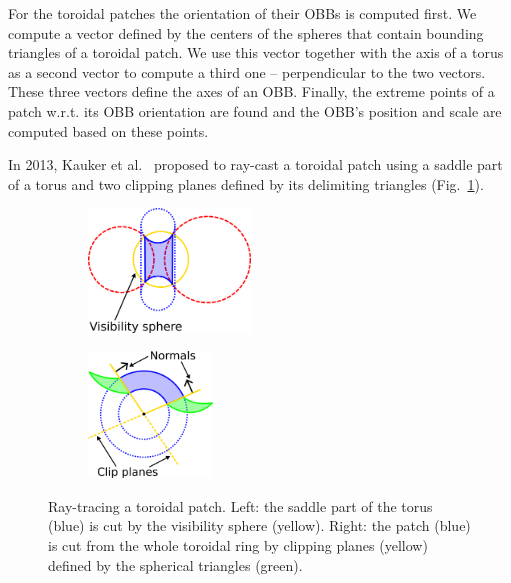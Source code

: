For the toroidal patches the orientation of their OBBs is computed first.
We compute a vector defined by the centers of the spheres that contain bounding triangles of a toroidal patch.
We use this vector together with the axis of a torus as a second vector to compute a third one -- perpendicular to the two vectors.
These three vectors define the axes of an OBB.
Finally, the extreme points of a patch w.r.t. its OBB orientation are found and the OBB's position and scale are computed based on these points.

In 2013, Kauker et al.~\cite{kauker2013rendering} proposed to ray-cast a toroidal patch using a saddle part of a torus and two clipping planes defined by its delimiting triangles (Fig.~\ref{fig:torus}).
\begin{figure}[htp]
  \centering
  \begin{subfigure}[t]{0.55\columnwidth}
    \centering
    \includegraphics[width=1.7in]{image/torus-vs.png}
  \end{subfigure}%
  \quad
  \begin{subfigure}[t]{0.4\columnwidth}
    \centering
    \includegraphics[width=1.3in]{image/torus-planes.png}
  \end{subfigure}
	\caption{Ray-tracing a toroidal patch. Left: the saddle part of the torus (blue) is cut by the visibility sphere (yellow).
Right: the patch (blue) is cut from the whole toroidal ring by clipping planes (yellow) defined by the spherical triangles (green).}
	\label{fig:torus}
\end{figure}

